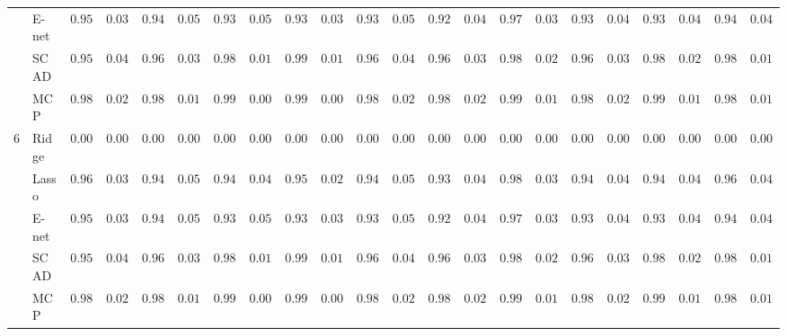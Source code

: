 \begin{tabular}{ll|ll|llllll|llllll|llllll}
 & E-net  & $0.9525$ & $0.0386$ & $0.9406$ & $0.0543$ & $0.9308$ & $0.0512$ & $0.9385$ & $0.0304$ & $0.9369$ & $0.0585$ & $0.9289$ & $0.0471$ & $0.9729$ & $0.0365$ & $0.9383$ & $0.0485$ & $0.9305$ & $0.0459$ & $0.9484$ & $0.0409$ \\
 & SCAD  & $0.9559$ & $0.0458$ & $0.9659$ & $0.0342$ & $0.9845$ & $0.0182$ & $0.9962$ & $0.0117$ & $0.9649$ & $0.0405$ & $0.9679$ & $0.0372$ & $0.9838$ & $0.0216$ & $0.9642$ & $0.0329$ & $0.9825$ & $0.0245$ & $0.9850$ & $0.0145$ \\
 & MCP  & $0.9836$ & $0.0208$ & $0.9873$ & $0.0162$ & $0.9952$ & $0.0080$ & $0.9970$ & $0.0063$ & $0.9843$ & $0.0230$ & $0.9869$ & $0.0211$ & $0.9925$ & $0.0122$ & $0.9836$ & $0.0204$ & $0.9931$ & $0.0114$ & $0.9897$ & $0.0105$ \\\hline
6 & Ridge  & $0.0000$ & $0.0000$ & $0.0000$ & $0.0000$ & $0.0000$ & $0.0000$ & $0.0000$ & $0.0000$ & $0.0000$ & $0.0000$ & $0.0000$ & $0.0000$ & $0.0000$ & $0.0000$ & $0.0000$ & $0.0000$ & $0.0000$ & $0.0000$ & $0.0000$ & $0.0000$ \\
 & Lasso  & $0.9611$ & $0.0382$ & $0.9495$ & $0.0561$ & $0.9416$ & $0.0491$ & $0.9568$ & $0.0297$ & $0.9464$ & $0.0594$ & $0.9384$ & $0.0483$ & $0.9803$ & $0.0391$ & $0.9490$ & $0.0468$ & $0.9424$ & $0.0415$ & $0.9628$ & $0.0429$ \\
 & E-net  & $0.9525$ & $0.0386$ & $0.9406$ & $0.0543$ & $0.9308$ & $0.0512$ & $0.9385$ & $0.0304$ & $0.9369$ & $0.0585$ & $0.9289$ & $0.0471$ & $0.9729$ & $0.0365$ & $0.9383$ & $0.0485$ & $0.9305$ & $0.0459$ & $0.9484$ & $0.0409$ \\
 & SCAD  & $0.9559$ & $0.0458$ & $0.9659$ & $0.0342$ & $0.9845$ & $0.0182$ & $0.9962$ & $0.0117$ & $0.9649$ & $0.0405$ & $0.9679$ & $0.0372$ & $0.9838$ & $0.0216$ & $0.9642$ & $0.0329$ & $0.9825$ & $0.0245$ & $0.9850$ & $0.0145$ \\
 & MCP  & $0.9836$ & $0.0208$ & $0.9873$ & $0.0162$ & $0.9952$ & $0.0080$ & $0.9970$ & $0.0063$ & $0.9843$ & $0.0230$ & $0.9869$ & $0.0211$ & $0.9925$ & $0.0122$ & $0.9836$ & $0.0204$ & $0.9931$ & $0.0114$ & $0.9897$ & $0.0105$ \\
\hline 
\end{tabular}

